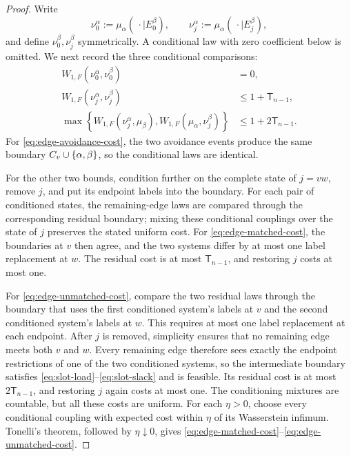 \begin{proof}
Write
\[
  \nu_0^\alpha:=\mu_\alpha(\,\cdot\mid E_0^\beta),
  \qquad
  \nu_j^\alpha:=\mu_\alpha(\,\cdot\mid E_j^\beta),
\]
and define \(\nu_0^\beta,\nu_j^\beta\) symmetrically.  A conditional law
with zero coefficient below is omitted.  We next record the three
conditional comparisons:
\begin{align}
  W_{1,F}(\nu_0^\alpha,\nu_0^\beta)&=0,
  \label{eq:edge-avoidance-cost}\\
  W_{1,F}(\nu_j^\alpha,\nu_j^\beta)&\le1+\mathsf T_{n-1},
  \label{eq:edge-matched-cost}\\
  \max\!\left\{
    W_{1,F}(\nu_j^\alpha,\mu_\beta),
    W_{1,F}(\mu_\alpha,\nu_j^\beta)
  \right\}&\le1+2\mathsf T_{n-1}.
  \label{eq:edge-unmatched-cost}
\end{align}
For \eqref{eq:edge-avoidance-cost}, the two avoidance events produce the
same boundary \(C_v\cup\left\{\alpha,\beta\right\}\), so the conditional laws are
identical.

For the other two bounds, condition further on the complete state of
\(j=vw\), remove \(j\), and put its endpoint labels into the boundary.
For each pair of conditioned states, the remaining-edge laws are compared
through the corresponding residual boundary; mixing these conditional
couplings over the state of $j$ preserves the stated uniform cost.
For \eqref{eq:edge-matched-cost}, the boundaries at \(v\) then agree, and
the two systems differ by at most one label replacement at \(w\).  The
residual cost is at most \(\mathsf T_{n-1}\), and restoring \(j\) costs at
most one.

For \eqref{eq:edge-unmatched-cost}, compare the two residual laws through
the boundary that uses the first conditioned system's labels at \(v\) and
the second conditioned system's labels at \(w\).  This requires at most
one label replacement at each endpoint.  After \(j\) is removed, simplicity ensures
that no remaining edge meets both \(v\) and \(w\).  Every remaining edge
therefore sees exactly the endpoint restrictions of one of the two
conditioned systems, so the intermediate boundary satisfies
\eqref{eq:slot-load}--\eqref{eq:slot-slack} and is feasible.  Its residual
cost is at most \(2\mathsf T_{n-1}\), and restoring \(j\) again costs at
most one.
The conditioning mixtures are countable, but all these costs are uniform.
For each \(\eta>0\), choose every conditional coupling with expected cost
within \(\eta\) of its Wasserstein infimum.  Tonelli's theorem, followed by
\(\eta\downarrow0\), gives
\eqref{eq:edge-matched-cost}--\eqref{eq:edge-unmatched-cost}.


\end{proof}
